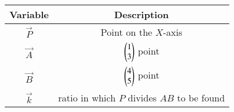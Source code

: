 \begin{tabular}[12pt]{ |c| c|}
    \hline
    \textbf{Variable} & \textbf{Description}\\ 
    \hline
    $\vec{P}$ & Point on the $X$-axis\\
    \hline
    $\vec{A}$ & $\begin{pmatrix}1\\3\end{pmatrix}$ point\\
    \hline
    $\vec{B}$ & $\begin{pmatrix}4\\5\end{pmatrix}$ point\\
    \hline
    $\vec{k}$ & ratio in which $P$ divides $AB$ to be found\\
    \hline
\end{tabular}
